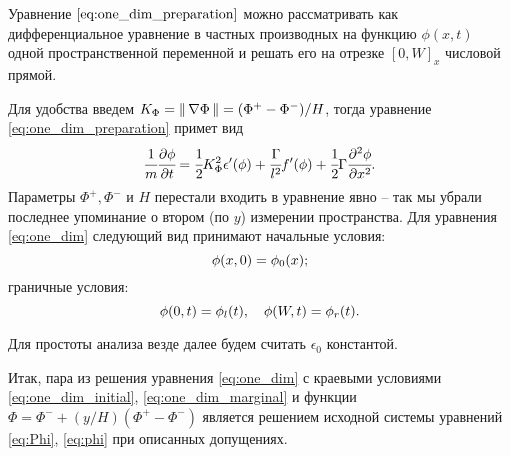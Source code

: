 Уравнение $\eqref{eq:one_dim_preparation}$ можно рассматривать как дифференциальное уравнение в частных производных на функцию $\phi(x, t)$ одной пространственной переменной и решать его на отрезке $[0, W]_x$ числовой прямой.

Для удобства введем $K_\Phi = \| \, \nabla \Phi \, \| = (\Phi^+ - \Phi^-) / H$, тогда уравнение \eqref{eq:one_dim_preparation} примет вид
\begin{equation}
	\cfrac{1}{m} \cfrac{\partial \phi}{\partial t} = \cfrac{1}{2} K_\Phi^2 \epsilon'(\phi) + \cfrac{\Gamma}{l^2} f'(\phi) + \cfrac{1}{2} \Gamma \cfrac{\partial^2 \phi}{\partial x^2} {\text{.}}
	\label{eq:one_dim}
\end{equation}
Параметры $\Phi^+, \Phi^-$ и $H$ перестали входить в уравнение явно -- так мы убрали последнее упоминание о втором (по $y$) измерении пространства. Для уравнения \eqref{eq:one_dim} следующий вид принимают начальные условия:
\begin{equation}
	\phi(x, 0) = \phi_0(x) {\text{;}}
	\label{eq:one_dim_initial}
\end{equation}
граничные условия:
\begin{equation}
	\phi(0, t) = \phi_l(t), \quad \phi(W, t) = \phi_r(t) {\text{.}}
	\label{eq:one_dim_marginal}
\end{equation}

Для простоты анализа везде далее будем считать $\epsilon_0$ константой.

Итак, пара из решения уравнения \eqref{eq:one_dim} с краевыми условиями \eqref{eq:one_dim_initial}, \eqref{eq:one_dim_marginal} и функции $\Phi = \Phi^- + (y / H)(\Phi^+ - \Phi^-)$ является решением исходной системы уравнений \eqref{eq:Phi}, \eqref{eq:phi} при описанных допущениях.